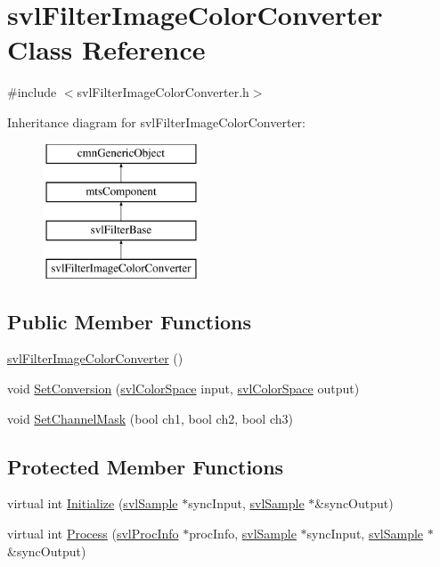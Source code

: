 \hypertarget{classsvl_filter_image_color_converter}{}\section{svl\+Filter\+Image\+Color\+Converter Class Reference}
\label{classsvl_filter_image_color_converter}


{\ttfamily \#include $<$svl\+Filter\+Image\+Color\+Converter.\+h$>$}

Inheritance diagram for svl\+Filter\+Image\+Color\+Converter\+:\begin{figure}[H]
\begin{center}
\leavevmode
\includegraphics[height=4.000000cm]{d8/d50/classsvl_filter_image_color_converter}
\end{center}
\end{figure}
\subsection*{Public Member Functions}
\begin{DoxyCompactItemize}
\item 
\hyperlink{classsvl_filter_image_color_converter_abfb774f943487255c13472f0bf20c2c9}{svl\+Filter\+Image\+Color\+Converter} ()
\item 
void \hyperlink{classsvl_filter_image_color_converter_acd229ef87ef678b310e60f689ce2da0e}{Set\+Conversion} (\hyperlink{svl_definitions_8h_a4900d9f4fac6e7b445742715a3a4c254}{svl\+Color\+Space} input, \hyperlink{svl_definitions_8h_a4900d9f4fac6e7b445742715a3a4c254}{svl\+Color\+Space} output)
\item 
void \hyperlink{classsvl_filter_image_color_converter_abeb8be823a3bced7cbfa32fada84d348}{Set\+Channel\+Mask} (bool ch1, bool ch2, bool ch3)
\end{DoxyCompactItemize}
\subsection*{Protected Member Functions}
\begin{DoxyCompactItemize}
\item 
virtual int \hyperlink{classsvl_filter_image_color_converter_a8cfddbaa6db791510f11ce1fead60e26}{Initialize} (\hyperlink{classsvl_sample}{svl\+Sample} $\ast$sync\+Input, \hyperlink{classsvl_sample}{svl\+Sample} $\ast$\&sync\+Output)
\item 
virtual int \hyperlink{classsvl_filter_image_color_converter_a28479834b3234c121305b084ccc8a220}{Process} (\hyperlink{structsvl_proc_info}{svl\+Proc\+Info} $\ast$proc\+Info, \hyperlink{classsvl_sample}{svl\+Sample} $\ast$sync\+Input, \hyperlink{classsvl_sample}{svl\+Sample} $\ast$\&sync\+Output)
\end{DoxyCompactItemize}
